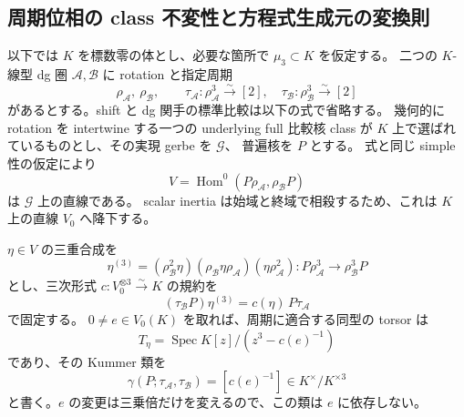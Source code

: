 \subsection{周期位相の class 不変性と方程式生成元の変換則}

以下では $K$ を標数零の体とし、必要な箇所で $\mu_3\subset K$ を仮定する。
二つの $K$-線型 dg 圏 $\mathcal A,\mathcal B$ に rotation と指定周期
\[
 \rho_{\mathcal A},\ \rho_{\mathcal B},\qquad
 \tau_{\mathcal A}:\rho_{\mathcal A}^3\xrightarrow{\sim}[2],\quad
 \tau_{\mathcal B}:\rho_{\mathcal B}^3\xrightarrow{\sim}[2]
\]
があるとする。shift と dg 関手の標準比較は以下の式で省略する。
幾何的に rotation を intertwine する一つの underlying full 比較核 class が
$K$ 上で選ばれているものとし、その実現 gerbe を $\mathcal G$、
普遍核を $P$ とする。
式と同じ simple 性の仮定により
\[
 V=\operatorname{Hom}^0(P\rho_{\mathcal A},\rho_{\mathcal B}P)
\]
は $\mathcal G$ 上の直線である。
scalar inertia は始域と終域で相殺するため、これは $K$ 上の直線 $V_0$ へ降下する。

$\eta\in V$ の三重合成を
\[
 \eta^{(3)}
 =(\rho_{\mathcal B}^2\eta)
  (\rho_{\mathcal B}\eta\rho_{\mathcal A})
  (\eta\rho_{\mathcal A}^2)
 :P\rho_{\mathcal A}^3\longrightarrow\rho_{\mathcal B}^3P
\]
とし、三次形式 $c:V_0^{\otimes3}\xrightarrow{\sim}K$ の規約を
\begin{equation}\label{eq:nfm-period-phase-convention}
 (\tau_{\mathcal B}P)\eta^{(3)}
      =c(\eta)\,P\tau_{\mathcal A}
\end{equation}
で固定する。
$0\ne e\in V_0(K)$ を取れば、周期に適合する同型の torsor は
\[
 T_\eta=\operatorname{Spec}K[z]/(z^3-c(e)^{-1})
\]
であり、その Kummer 類を
\begin{equation}\label{eq:nfm-period-phase-kummer}
 \gamma(P;\tau_{\mathcal A},\tau_{\mathcal B})
      =[c(e)^{-1}]
      \in K^\times/K^{\times3}
\end{equation}
と書く。$e$ の変更は三乗倍だけを変えるので、この類は $e$ に依存しない。

